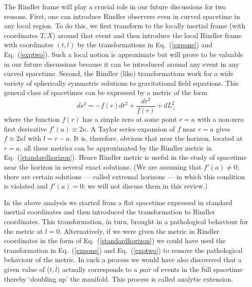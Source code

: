 \documentclass[12pt]{iopart}
\def\eq#1{{Eq.~(\ref{#1})}}
\begin{document}
The Rindler frame will play a crucial role in our future discussions for two reasons.
First, one can introduce Rindler observers even in curved spacetime in any local region.
To do this, we 
 first transform to the locally inertial frame (with coordinates $T,X$) around that event and then introduce
the local Rindler frame with coordinates $(t,l)$ by the  transformations in \eq{expone} and \eq{exptwo}. Such a local notion is approximate but will prove to be valuable in our future discussions because it can be introduced around any event in any curved spacetime.
Second, the Rindler (like) transformations work for a wide variety of spherically symmetric solutions to gravitational field  equations.
This general class of spacetimes can be expressed by a metric of the form 
\begin{equation}
 ds^2 =- f(r)  dt^2 + \frac{dr^2}{f(r)}  + dL_\perp^2
 \label{fbyf}
\end{equation} 
where the function $f(r)$ has a simple zero at some point $r=a$ with a non-zero first derivative $f'(a)\equiv 2\kappa$. A Taylor series expansion of $f$ near $r=a$ 
gives $f \approx 2\kappa l$ with $l=r-a$. It is, therefore, obvious that near the horizon, located at $r=a$, all these metrics can be approximated by the Rindler metric in 
\eq{standardhorizon}. Hence Rindler metric is useful in the study of spacetime near the horizon in several exact solutions. (We are assuming that $f'(a)\neq 0$; there are certain solutions --- called extremal horizons --- in which this condition is violated and $f'(a)=0$; we will not discuss them in this review.)

In the above analysis we started from a flat spacetime expressed in standard inertial coordinates and then introduced the transformation to Rindler coordinates. This transformation, in turn, brought in a pathological behaviour for the metric at $l=0$.
Alternatively, if we were given the metric in Rindler coordinates in the form of 
\eq{standardhorizon} we could have used the transformation in \eq{expone} and
\eq{exptwo} to remove the pathological behaviour of the metric. In such a process
we would have also discovered that a given value of ($t,l$) actually corresponds to a \textit{pair} of events in the full spacetime thereby `doubling up' the manifold. This process is called analytic extension. 
\end{document}
